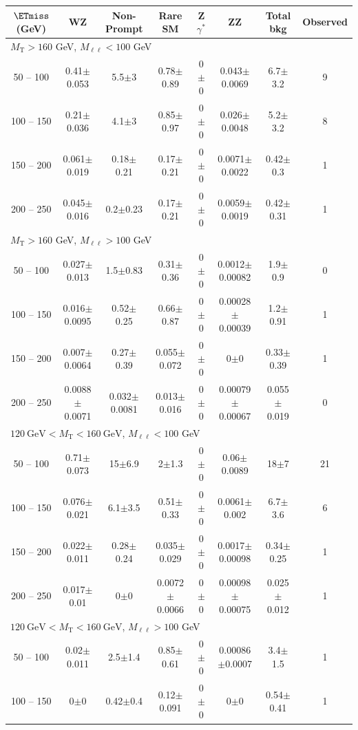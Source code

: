\begin{landscape}
\begin{table}
\begin{center}
\begin{tabular}{| c | c c c c c c  c | }
$\ETmiss$ (GeV) & WZ & Non-Prompt & Rare SM & Z$\gamma^*$ & ZZ & Total bkg & Observed\\\hline\hline
\multicolumn{8}{l}{$M_{\text{T}} > 160$ GeV, $M_{\ell\ell} < 100$ GeV}\\\hline\hline
50 -- 100&0.41$\pm$0.053&5.5$\pm$3&0.78$\pm$0.89&0$\pm$0&0.043$\pm$0.0069&6.7$\pm$3.2&9\\
100 -- 150&0.21$\pm$0.036&4.1$\pm$3&0.85$\pm$0.97&0$\pm$0&0.026$\pm$0.0048&5.2$\pm$3.2&8\\
150 -- 200&0.061$\pm$0.019&0.18$\pm$0.21&0.17$\pm$0.21&0$\pm$0&0.0071$\pm$0.0022&0.42$\pm$0.3&1\\
200 -- 250&0.045$\pm$0.016&0.2$\pm$0.23&0.17$\pm$0.21&0$\pm$0&0.0059$\pm$0.0019&0.42$\pm$0.31&1\\
\hline\hline
\multicolumn{8}{l}{$M_{\text{T}} > 160$ GeV, $M_{\ell\ell} > 100$ GeV}\\\hline\hline
50 -- 100&0.027$\pm$0.013&1.5$\pm$0.83&0.31$\pm$0.36&0$\pm$0&0.0012$\pm$0.00082&1.9$\pm$0.9&0\\
100 -- 150&0.016$\pm$0.0095&0.52$\pm$0.25&0.66$\pm$0.87&0$\pm$0&0.00028$\pm$0.00039&1.2$\pm$0.91&1\\
150 -- 200&0.007$\pm$0.0064&0.27$\pm$0.39&0.055$\pm$0.072&0$\pm$0&0$\pm$0&0.33$\pm$0.39&1\\
200 -- 250&0.0088$\pm$0.0071&0.032$\pm$0.0081&0.013$\pm$0.016&0$\pm$0&0.00079$\pm$0.00067&0.055$\pm$0.019&0\\
\hline\hline
\multicolumn{8}{l}{$120~\mathrm{GeV} < M_{\text{T}} < 160~\mathrm{GeV}$, $M_{\ell\ell} < 100$ GeV}\\\hline\hline
50 -- 100&0.71$\pm$0.073&15$\pm$6.9&2$\pm$1.3&0$\pm$0&0.06$\pm$0.0089&18$\pm$7&21\\
100 -- 150&0.076$\pm$0.021&6.1$\pm$3.5&0.51$\pm$0.33&0$\pm$0&0.0061$\pm$0.002&6.7$\pm$3.6&6\\
150 -- 200&0.022$\pm$0.011&0.28$\pm$0.24&0.035$\pm$0.029&0$\pm$0&0.0017$\pm$0.00098&0.34$\pm$0.25&1\\
200 -- 250&0.017$\pm$0.01&0$\pm$0&0.0072$\pm$0.0066&0$\pm$0&0.00098$\pm$0.00075&0.025$\pm$0.012&1\\
\hline\hline
\multicolumn{8}{l}{$120~\mathrm{GeV} < M_{\text{T}} < 160~\mathrm{GeV}$, $M_{\ell\ell} > 100$ GeV}\\\hline\hline
50 -- 100&0.02$\pm$0.011&2.5$\pm$1.4&0.85$\pm$0.61&0$\pm$0&0.00086$\pm$0.0007&3.4$\pm$1.5&1\\
100 -- 150&0$\pm$0&0.42$\pm$0.4&0.12$\pm$0.091&0$\pm$0&0$\pm$0&0.54$\pm$0.41&1\\

\end{tabular}
\end{center}
\end{table}
\end{landscape}
